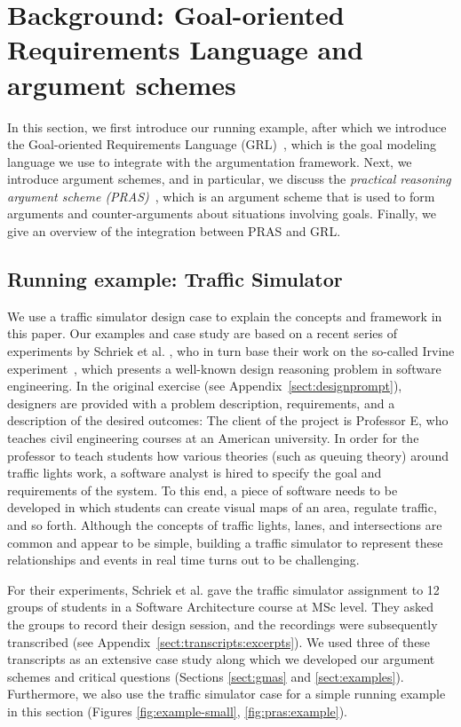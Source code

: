 \section{Background: Goal-oriented Requirements Language and argument schemes}
\label{sect:background}

In this section, we first introduce our running example, after which we introduce the Goal-oriented Requirements Language (GRL)~\cite{Amyot:2010:EGM:1841349.1841356}, which is the goal modeling language we use to integrate with the argumentation framework. Next, we introduce argument schemes, and in particular, we discuss the \emph{practical reasoning argument scheme (PRAS)}~\cite{atkinson2007}, which is an argument scheme that is used to form arguments and counter-arguments about situations involving goals. Finally, we give an overview of the integration between PRAS and GRL.  %

\subsection{Running example: Traffic Simulator}
\label{sect:goals:runningexample}

We use a traffic simulator design case to explain the concepts and framework in this paper. Our examples and case study are based on a recent series of experiments by Schriek et al. \cite{SchriekEtal2016}, who in turn base their work on the so-called Irvine experiment~\cite{UCIworkshop}, which presents a well-known design reasoning problem in software engineering. In the original exercise (see Appendix~\ref{sect:designprompt}), designers are provided with a problem description, requirements, and a description of the desired outcomes: The client of the project is Professor E, who teaches civil engineering courses at an American university. In order for the professor to teach students how various theories (such as queuing theory) around traffic lights work, a software analyst is hired to specify the goal and requirements of the system. To this end, a piece of software needs to be developed in which students can create visual maps of an area, regulate traffic, and so forth. Although the concepts of traffic lights, lanes, and intersections are common and appear to be simple, building a traffic simulator to represent these relationships and events in real time turns out to be challenging. 

For their experiments, Schriek et al. \cite{SchriekEtal2016} gave the traffic simulator assignment to 12 groups of students in a Software Architecture course at MSc level. They asked the groups to record their design session, and the recordings were subsequently transcribed (see Appendix~\ref{sect:transcripts:excerpts}). We used three of these transcripts as an extensive case study along which we developed our argument schemes and critical questions (Sections \ref{sect:gmas} and \ref{sect:examples}). Furthermore, we also use the traffic simulator case for a simple  running example in this section (Figures \ref{fig:example-small}, \ref{fig:pras:example}). 

